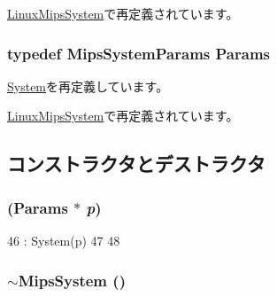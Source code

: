 \hyperlink{classLinuxMipsSystem_a3d1083cbefc15728ca643470f9efbf13}{LinuxMipsSystem}で再定義されています。\hypertarget{classMipsSystem_acf01be080284e8262bc1ff41fbd1710c}{
\subsubsection[{Params}]{\setlength{\rightskip}{0pt plus 5cm}typedef MipsSystemParams {\bf Params}}}
\label{classMipsSystem_acf01be080284e8262bc1ff41fbd1710c}


\hyperlink{classSystem_a5f461be6222ce76bffcb70f27d820c56}{System}を再定義しています。

\hyperlink{classLinuxMipsSystem_a3d1083cbefc15728ca643470f9efbf13}{LinuxMipsSystem}で再定義されています。

\subsection{コンストラクタとデストラクタ}
\hypertarget{classMipsSystem_a62dbd286dd7ffc15d71da3c22bfafe7a}{
\subsubsection[{MipsSystem}]{ ({\bf Params} $\ast$ {\em p})}}
\label{classMipsSystem_a62dbd286dd7ffc15d71da3c22bfafe7a}



\begin{DoxyCode}
46                                 : System(p)
47 {
48 }
\end{DoxyCode}
\hypertarget{classMipsSystem_a325a17b3fbc7b08bfa6b90e3e2be0253}{
\subsubsection[{$\sim$MipsSystem}]{\setlength{\rightskip}{0pt plus 5cm}$\sim${\bf MipsSystem} ()}}
\label{classMipsSystem_a325a17b3fbc7b08bfa6b90e3e2be0253}



